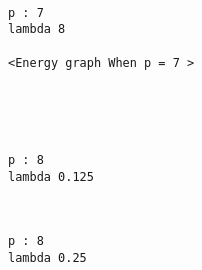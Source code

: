 \documentclass[11pt]{article}
\begin{document}
    \begin{center}
    \end{center}
    { \hspace*{\fill} \\}
    
    \begin{Verbatim}[commandchars=\\\{\}]
p : 7
lambda 8

<Energy graph When p = 7 >

    \end{Verbatim}

    \begin{center}
    \end{center}
    { \hspace*{\fill} \\}
    
    \begin{center}
    \end{center}
    { \hspace*{\fill} \\}
    
    \begin{Verbatim}[commandchars=\\\{\}]
p : 8
lambda 0.125

    \end{Verbatim}

    \begin{center}
    \end{center}
    { \hspace*{\fill} \\}
    
    \begin{Verbatim}[commandchars=\\\{\}]
p : 8
lambda 0.25

    \end{Verbatim}

    \begin{center}
    \end{center}
    { \hspace*{\fill} \\}
    
\end{document}

